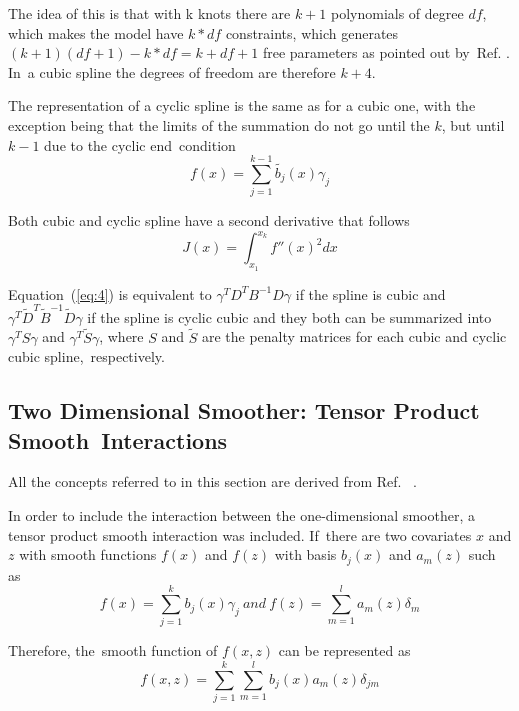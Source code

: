 \documentclass[energies,article,accept,pdftex,moreauthors]{Definitions/mdpi}
\begin{document}
     The idea of this is that with k knots there are $k+1$ polynomials of degree $df$, which makes the model have $k*df$ constraints, which generates $(k+1)(df+1)-k*df=k+df+1$ free parameters as pointed out by~Ref. \citep{Perperoglou2019AR}. In~a cubic spline  the degrees of freedom are therefore $k+4$.
     
     The representation of a cyclic spline is the same as for a cubic one, with the exception being that the limits of the summation do not go until the $k$, but until $k-1$ due to the cyclic end~condition
\begin{equation}
   f(x)=\sum_{j=1}^{k-1}\tilde{b_{j}}(x)\gamma_{j}
    \end{equation}
    
    Both cubic and cyclic spline have a second derivative that follows
\begin{equation} \label{eq:4}
   J(x)=\int_{x_1}^{x_k}f''(x)^2dx
	\end{equation}
	
 Equation~(\ref{eq:4}) is equivalent to \(\gamma^{T} D^{T} B^{-1} D\gamma\) if the spline is cubic and \(\gamma^{T}\tilde{D}^{T}\tilde{B}^{-1}\tilde{D}\gamma\) if the spline is cyclic cubic and they both can be summarized into \(\gamma^TS\gamma\) and \(\gamma^T \tilde{S}\gamma \), where $S$ and $\tilde{S}$ are the penalty matrices for each cubic and cyclic cubic spline,~respectively. 


     \subsection{Two Dimensional Smoother: Tensor Product Smooth~Interactions}
     All the concepts referred to in this section are derived from Ref. ~\citep{Wood2017GeneralizedR}.
     
     In order to include the interaction between the one-dimensional smoother, a tensor product smooth interaction was included.  If~there are two covariates $x$ and $z$ with smooth functions $f(x)$ and $f(z)$ with basis $b_{j}(x)$  and $a_m(z)$ such as
\begin{equation}
    f(x)=\sum_{j=1}^{k}b_{j}(x)\gamma_{j} \: and \: f(z)=\sum_{m=1}^{l} a_{m}(z)\delta_{m}  
    \end{equation}
    
    Therefore, the~smooth function of $f(x,z)$ can be represented as
\begin{equation}
    f(x,z)=\sum_{j=1}^{k}\sum_{m=1}^{l}b_{j}(x)a_{m}(z)\delta_{jm}
    \end{equation}
    
\end{document}

